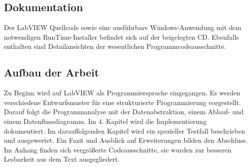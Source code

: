
\subsection{Dokumentation}
Der LabVIEW Quellcode  sowie eine ausführbare Windows-Anwendung mit dem notwendigen RunTime-Installer befindet sich auf der beigelegten CD.
Ebenfalls enthalten sind Detailansichten der wesentlichen Programmcodeausschnitte.


\subsection{Aufbau der Arbeit}

Zu Beginn wird auf LabVIEW als Programmiersprache eingegangen. Es werden verschiedene Entwurfsmuster für eine strukturierte Programmierung vorgestellt.
Darauf folgt die Programmanalyse mit der Datenabstraktion, einem Ablauf-  und einem Datenflussdiagramm. 
Im 4. Kapitel wird die Implementierung dokumentiert. 
Im darauffolgenden Kapitel wird ein spezieller Testfall beschrieben und ausgewertet. 
Ein Fazit und Ausblick auf Erweiterungen bilden den Abschluss. 
Im Anhang finden sich vergrößerte Codeausschnitte, sie wurden zur besseren Lesbarkeit aus dem Text ausgegliedert.





